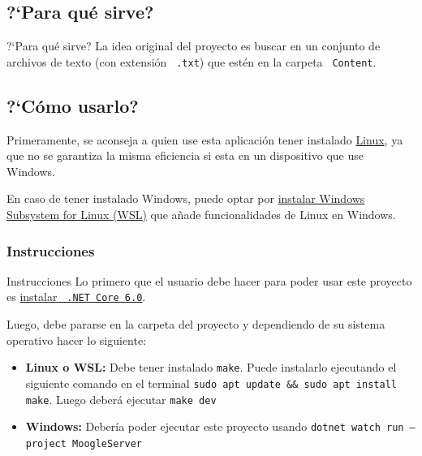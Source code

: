 \documentclass{beamer}
\begin{document}
\subsection{?`Para qu\'e sirve?}

\begin{frame}{?`Para qu\'e sirve?}
  La idea original del proyecto es buscar en un conjunto de archivos de texto
  (con extensión {\tt \color{gray45} .txt}) que estén en la carpeta {\tt
      \color{gray45}Content}.
\end{frame}

\subsection*{?`C\'omo usarlo?}

\begin{frame}
  Primeramente, se aconseja a quien use esta aplicaci\'on tener instalado
  \href{https://es.wikipedia.org/wiki/Linux}{Linux}, ya que no se garantiza la
  misma eficiencia si esta en un dispositivo que use Windows.
\end{frame}

\begin{frame}
  En caso de tener instalado Windows, puede optar por
  \href{https://learn.microsoft.com/es-es/windows/wsl/install}{instalar Windows
    Subsystem for Linux (WSL)} que a\~nade funcionalidades de Linux en Windows.
\end{frame}

\subsubsection*{Instrucciones}

\begin{frame}{Instrucciones}
  Lo primero que el usuario debe hacer para poder usar este proyecto es
  \href{https://learn.microsoft.com/es-es/dotnet/core/install/}{instalar {\tt
        .NET Core 6.0}}.

  \pause

  Luego, debe pararse en la carpeta del proyecto y dependiendo de su sistema
  operativo hacer lo siguiente:

  \begin{itemize}[<+->]
    \item {\bf Linux o WSL:} Debe tener instalado {\tt make}. Puede instalarlo ejecutando el siguiente comando en el terminal {\tt sudo apt update \&\& sudo apt install make}. Luego deber\'a ejecutar {\tt make dev}
    \item {\bf Windows:}  Debería poder ejecutar este proyecto usando {\tt dotnet watch run --project MoogleServer}
  \end{itemize}
\end{frame}
\end{document}
